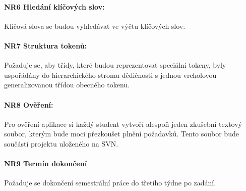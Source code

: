 \paragraph {NR6 Hledání klíčových slov:} Klíčová slova se budou vyhledávat ve výčtu klíčových slov.


\paragraph {NR7 Struktura tokenů:} Požaduje se, aby třídy, které budou reprezentovat speciální tokeny, byly uspořádány do hierarchického stromu dědičnosti s jednou vrcholovou generalizovanou třídou obecného tokenu.

\paragraph {NR8 Ověření:} Pro ověření aplikace si každý student vytvoří alespoň jeden zkušební textový soubor, kterým bude moci přezkoušet plnění požadavků. Tento soubor bude součástí projektu uloženého na SVN.

\paragraph {NR9 Termín dokončení} Požaduje se dokončení semestrální práce do třetího týdne po zadání. 



